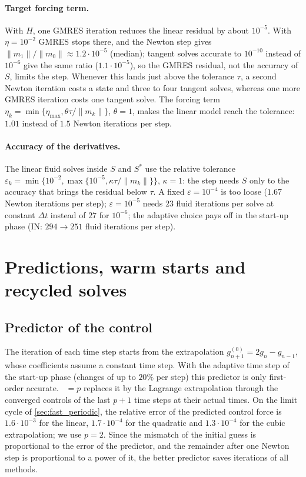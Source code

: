 \documentclass[11pt,a4paper]{article}
\theoremstyle{definition}
\theoremstyle{remark}
\begin{document}
\paragraph{Target forcing term.} With $H$, one GMRES iteration reduces the linear residual by about
$10^{-5}$. With $\eta=10^{-2}$ GMRES stops there, and the Newton step gives
$\|m_1\|/\|m_0\|\approx1.2\cdot10^{-5}$ (median); tangent solves accurate to $10^{-10}$ instead of
$10^{-6}$ give the same ratio ($1.1\cdot10^{-5}$), so the GMRES residual, not the accuracy of $S$,
limits the step. Whenever this lands just above the tolerance $\tau$, a second Newton iteration
costs a state and three to four tangent solves, whereas one more GMRES iteration costs one tangent
solve. The forcing term $\eta_k=\min\{\eta_{\max},\theta\tau/\|m_k\|\}$, $\theta=1$, makes the linear
model reach the tolerance: $1.01$ instead of $1.5$ Newton iterations per step.

\paragraph{Accuracy of the derivatives.} The linear fluid solves inside $S$ and $S^*$ use the
relative tolerance $\varepsilon_k=\min\{10^{-2},\max\{10^{-5},\kappa\tau/\|m_k\|\}\}$, $\kappa=1$:
the step needs $S$ only to the accuracy that brings the residual below $\tau$. A fixed
$\varepsilon=10^{-4}$ is too loose ($1.67$ Newton iterations per step); $\varepsilon=10^{-5}$ needs
$23$ fluid iterations per solve at constant $\Delta t$ instead of $27$ for $10^{-6}$; the adaptive
choice pays off in the start-up phase (IN: $294\to251$ fluid iterations per step).


\section{Predictions, warm starts and recycled solves}\label{sec:acceleration}

\subsection{Predictor of the control}\label{sec:control_predictor}

The iteration of each time step starts from the
extrapolation $g^{(0)}_{n+1}=2g_n-g_{n-1}$, whose coefficients assume a constant time step. With
the adaptive time step of the start-up phase (changes of up to $20\%$ per step) this predictor is
only first-order accurate. ~$=p$ replaces it by the Lagrange
extrapolation through the converged controls of the last $p+1$ time steps at their actual times.
On the limit cycle of \cref{sec:fast_periodic}, the relative error of the predicted control force
is $1.6\cdot10^{-3}$ for the linear, $1.7\cdot10^{-4}$ for the quadratic and $1.3\cdot10^{-4}$ for
the cubic extrapolation; we use $p=2$. Since the mismatch of the initial guess is proportional to
the error of the predictor, and the remainder after one Newton step is proportional to a power of
it, the better predictor saves iterations of all methods.
\end{document}
